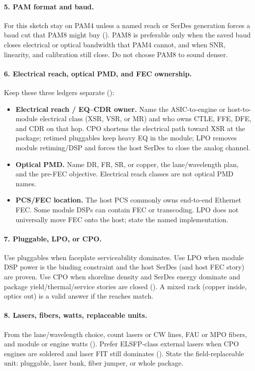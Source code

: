 \paragraph{5. PAM format and baud.}
For this sketch stay on PAM4 unless a named reach or SerDes generation forces a
baud cut that PAM8 might buy (). PAM8 is preferable only
when the saved baud closes electrical or optical bandwidth that PAM4 cannot,
and when SNR, linearity, and calibration still close. Do not choose PAM8 to
sound denser.

\paragraph{6. Electrical reach, optical PMD, and FEC ownership.}
Keep these three ledgers separate
():
\begin{itemize}
\item \textbf{Electrical reach / EQ--CDR owner.} Name the ASIC-to-engine or
      host-to-module electrical class (XSR, VSR, or MR) and who owns CTLE, FFE,
      DFE, and CDR on that hop. CPO shortens the electrical path toward XSR at
      the package; retimed pluggables keep heavy EQ in the module; LPO removes
      module retiming/DSP and forces the host SerDes to close the analog
      channel.
\item \textbf{Optical PMD.} Name DR, FR, SR, or copper, the lane/wavelength
      plan, and the pre-FEC objective. Electrical reach classes are not optical
      PMD names.
\item \textbf{PCS/FEC location.} The host PCS commonly owns end-to-end Ethernet
      FEC. Some module DSPs can contain FEC or transcoding. LPO does not
      universally move FEC onto the host; state the named implementation.
\end{itemize}

\paragraph{7. Pluggable, LPO, or CPO.}
Use pluggables when faceplate serviceability dominates. Use LPO when module
DSP power is the binding constraint and the host SerDes (and host FEC story)
are proven. Use CPO when shoreline density and SerDes energy dominate and
package yield/thermal/service stories are closed
(). A mixed rack (copper inside, optics out)
is a valid answer if the reaches match.

\paragraph{8. Lasers, fibers, watts, replaceable units.}
From the lane/wavelength choice, count lasers or CW lines, FAU or MPO fibers,
and module or engine watts (). Prefer ELSFP-class
external lasers when CPO engines are soldered and laser FIT still dominates
(). State the field-replaceable unit: pluggable, laser bank,
fiber jumper, or whole package.


